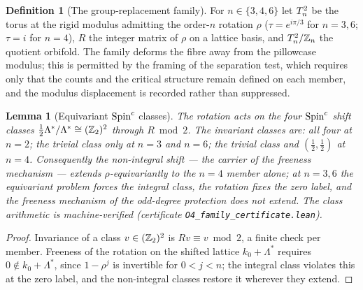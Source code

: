 \documentclass[11pt]{article}
\numberwithin{equation}{section}
\theoremstyle{plain}
\newtheorem{lemma}[theorem]{Lemma}
\theoremstyle{definition}
\newtheorem{definition}[theorem]{Definition}
\theoremstyle{remark}
\newcommand{\Zn}[1][n]{\mathbb{Z}_{#1}}
\begin{document}
\begin{definition}[The group-replacement family]\label{o4:family}
For $n \in \{3, 4, 6\}$ let $T^2_{n}$ be the torus at the rigid
modulus admitting the order-$n$ rotation $\rho$
($\tau = e^{i\pi/3}$ for $n = 3, 6$; $\tau = i$ for $n = 4$), $R$
the integer matrix of $\rho$ on a lattice basis, and
$\Ttwo_{n}/\Zn$ the quotient orbifold. The family deforms the fibre
away from the pillowcase modulus; this is permitted by the framing
of the separation test, which requires only that the counts and the
critical structure remain defined on each member, and the modulus
displacement is recorded rather than suppressed.
\end{definition}

\begin{lemma}[Equivariant $\text{Spin}^c$ classes]\label{o4:equivariance}
The rotation acts on the four $\text{Spin}^c$ shift classes
$\tfrac{1}{2}\Lambda^{*}/\Lambda^{*} \cong (\mathbb{Z}_2)^{2}$ through
$R \bmod 2$. The invariant classes are: all four at $n = 2$; the
trivial class only at $n = 3$ and $n = 6$; the trivial class and
$(\tfrac{1}{2}, \tfrac{1}{2})$ at $n = 4$. Consequently the
non-integral shift --- the carrier of the freeness mechanism ---
extends $\rho$-equivariantly to the $n = 4$ member alone; at
$n = 3, 6$ the equivariant problem forces the integral class, the
rotation fixes the zero label, and the freeness mechanism of the
odd-degree protection does not extend. The class arithmetic is
machine-verified (certificate
\texttt{O4\_family\_certificate.lean}).
\end{lemma}

\begin{proof}
Invariance of a class $v \in (\mathbb{Z}_2)^{2}$ is
$Rv \equiv v \bmod 2$, a finite check per member. Freeness of the
rotation on the shifted lattice $k_{0} + \Lambda^{*}$ requires
$0 \notin k_{0} + \Lambda^{*}$, since $1 - \rho^{j}$ is invertible
for $0 < j < n$; the integral class violates this at the zero
label, and the non-integral classes restore it wherever they
extend.
\end{proof}
\end{document}
